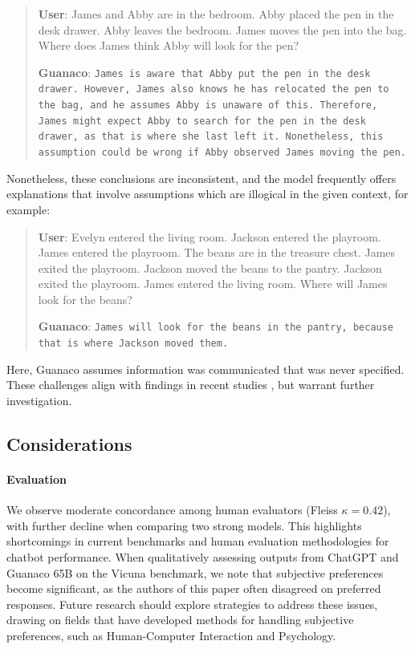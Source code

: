 \begin{quote}
    \textbf{User}: James and Abby are in the bedroom. Abby placed the pen in the desk drawer. Abby leaves the bedroom. James moves the pen into the bag. Where does James think Abby will look for the pen?

    \textbf{Guanaco}: \texttt{James is aware that Abby put the pen in the desk drawer. However, James also knows he has relocated the pen to the bag, and he assumes Abby is unaware of this. Therefore, James might expect Abby to search for the pen in the desk drawer, as that is where she last left it. Nonetheless, this assumption could be wrong if Abby observed James moving the pen.}
\end{quote}

Nonetheless, these conclusions are inconsistent, and the model frequently offers explanations that involve assumptions which are illogical in the given context, for example:

\begin{quote}
    \textbf{User}: Evelyn entered the living room. Jackson entered the playroom. James entered the playroom. The beans are in the treasure chest. James exited the playroom. Jackson moved the beans to the pantry. Jackson exited the playroom. James entered the living room. Where will James look for the beans?

    \textbf{Guanaco}: \texttt{James will look for the beans in the pantry, because that is where Jackson moved them.}
\end{quote}

Here, {Guanaco} assumes information was communicated that was never specified. These challenges align with findings in recent studies \cite{sap2022neural}, but warrant further investigation.

\subsection{Considerations}
\label{ssec:considerations}

\paragraph{Evaluation}

We observe moderate concordance among human evaluators (Fleiss $\kappa=0.42$), with further decline when comparing two strong models. This highlights shortcomings in current benchmarks and human evaluation methodologies for chatbot performance. When qualitatively assessing outputs from ChatGPT and {Guanaco} 65B on the Vicuna benchmark, we note that subjective preferences become significant, as the authors of this paper often disagreed on preferred responses. Future research should explore strategies to address these issues, drawing on fields that have developed methods for handling subjective preferences, such as Human-Computer Interaction and Psychology.

